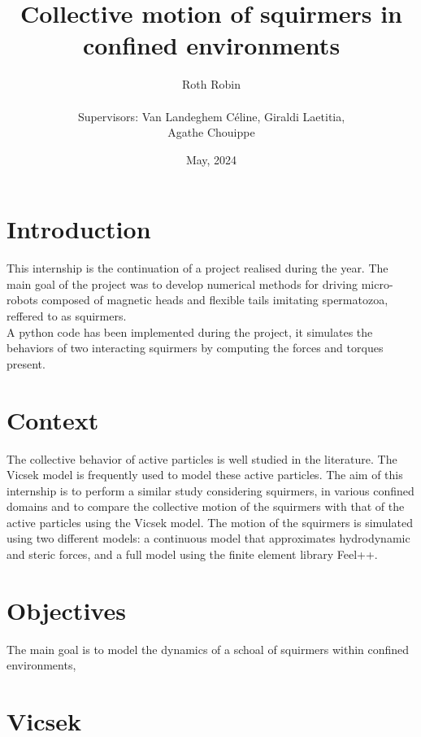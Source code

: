 \documentclass{article}
\begin{document}
\title{Collective motion of squirmers in confined environments}
\author{Roth Robin\\
\\
Supervisors: Van Landeghem Céline, Giraldi Laetitia,\\ Agathe Chouippe}
\date{May, 2024}
\maketitle

\tableofcontents

\section{Introduction}
This internship is the continuation of a project realised during the year. The main goal of the project was
to develop numerical methods for driving micro-robots composed of magnetic heads and flexible tails imitating spermatozoa, reffered to as squirmers.\\
A python code has been implemented during the project, it simulates the behaviors of two interacting squirmers by computing 
the forces and torques present.\\
\section{Context}
The collective behavior of active particles is well studied in the literature. 
The Vicsek model is frequently used to model these active particles. 
The aim of this internship is to perform a similar study considering squirmers, 
in various confined domains and to compare the collective motion of the squirmers with that of the active particles using the Vicsek model. 
The motion of the squirmers is simulated using two different models: a continuous model that approximates hydrodynamic and 
steric forces, and a full model using the finite element library Feel++.

\section{Objectives}
The main goal is to model the dynamics of a schoal of squirmers within confined environments, 

\section{Vicsek}
\end{document}
